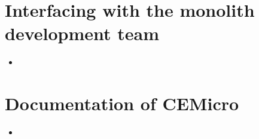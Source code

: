 \section{Interfacing with the monolith development team}

\begin{itemize}
  \item {}
\end{itemize}







\section{Documentation of CEMicro}

\begin{itemize}
  \item {}
\end{itemize}
